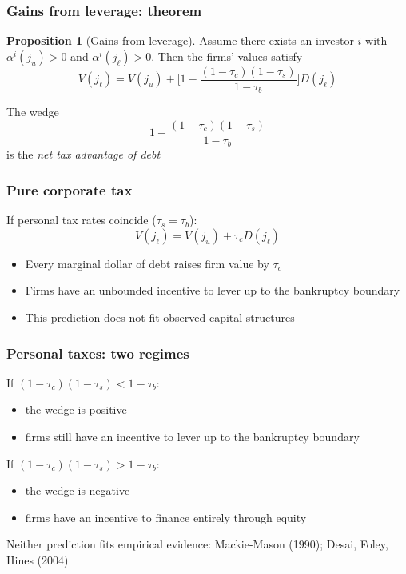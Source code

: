 \documentclass[blue]{beamer}
\theoremstyle{definition}
\theoremstyle{example}
\newtheorem*{proposition}{Proposition}
\begin{document}
\begin{frame}\frametitle{Gains from leverage: theorem}
\begin{proposition}[Gains from leverage]
Assume there exists an investor $i$ with $\alpha^i(j_u) > 0$ and $\alpha^i(j_\ell) > 0$.
Then the firms' values satisfy
\begin{equation*}
V(j_\ell) = V(j_u) + \biggl[1 - \frac{(1-\tau_c)(1-\tau_s)}{1-\tau_b}\biggr] D(j_\ell)
\end{equation*}
\end{proposition}
\bigskip

The wedge
\begin{equation*}
1 - \frac{(1-\tau_c)(1-\tau_s)}{1-\tau_b}
\end{equation*}
is the \emph{net tax advantage of debt}
\end{frame}

\begin{frame}\frametitle{Pure corporate tax}
If personal tax rates coincide ($\tau_s = \tau_b$):
\begin{equation*}
V(j_\ell) = V(j_u) + \tau_c D(j_\ell)
\end{equation*}
\bigskip

\begin{itemize}
\item Every marginal dollar of debt raises firm value by $\tau_c$
\item Firms have an unbounded incentive to lever up to the bankruptcy boundary
\item This prediction does not fit observed capital structures
\end{itemize}
\end{frame}

\begin{frame}\frametitle{Personal taxes: two regimes}
If $(1-\tau_c)(1-\tau_s) < 1 - \tau_b$:
\begin{itemize}
\item the wedge is positive
\item firms still have an incentive to lever up to the bankruptcy boundary
\end{itemize}
\bigskip

If $(1-\tau_c)(1-\tau_s) > 1 - \tau_b$:
\begin{itemize}
\item the wedge is negative
\item firms have an incentive to finance entirely through equity
\end{itemize}
\bigskip

Neither prediction fits empirical evidence: Mackie-Mason (1990); Desai, Foley, Hines (2004)
\end{frame}
\end{document}
